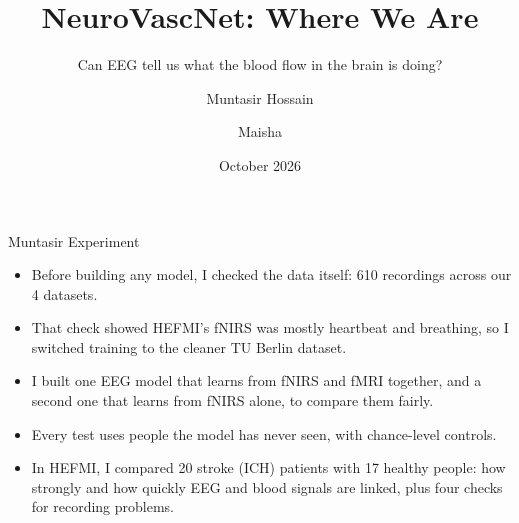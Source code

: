 \documentclass[aspectratio=169,11pt]{beamer}
\title{NeuroVascNet: Where We Are}
\subtitle{Can EEG tell us what the blood flow in the brain is doing?}
\author{Muntasir Hossain \and Maisha}
\date{October 2026}
\begin{document}
\begin{frame}
  \titlepage
\end{frame}

\begin{frame}{Muntasir Experiment}
\begin{slidebox}
\begin{itemize}\setlength{\itemsep}{5pt}
  \item Before building any model, I checked the data itself: 610 recordings across our 4 datasets.
  \item That check showed HEFMI's fNIRS was mostly heartbeat and breathing, so I switched training to the cleaner TU Berlin dataset.
  \item I built one EEG model that learns from fNIRS and fMRI together, and a second one that learns from fNIRS alone, to compare them fairly.
  \item Every test uses people the model has never seen, with chance-level controls.
  \item In HEFMI, I compared 20 stroke (ICH) patients with 17 healthy people: how strongly and how quickly EEG and blood signals are linked, plus four checks for recording problems.
\end{itemize}
\end{slidebox}
\end{frame}
\end{document}

